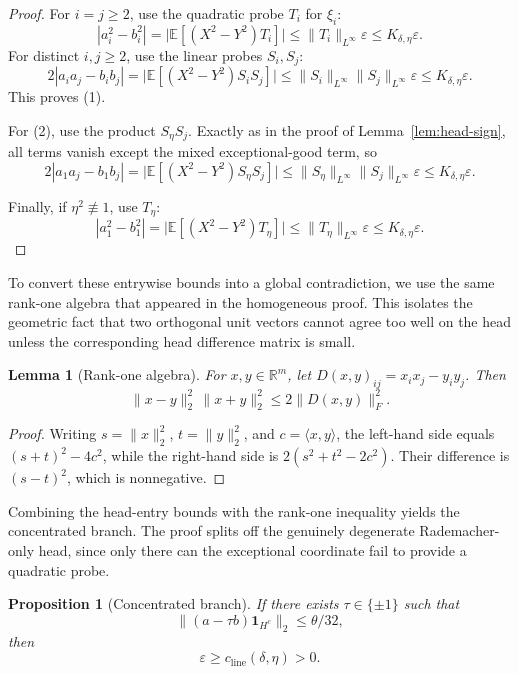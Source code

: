 \documentclass[11pt]{amsart}
\numberwithin{equation}{section}
\newtheorem{proposition}[theorem]{Proposition}
\newtheorem{lemma}[theorem]{Lemma}
\theoremstyle{definition}
\theoremstyle{remark}
\newcommand{\E}{\mathbb E}
\newcommand{\R}{\mathbb R}
\newcommand{\eps}{\varepsilon}
\newcommand{\norm}[1]{\lVert #1 \rVert}
\newcommand{\ip}[2]{\langle #1,#2\rangle}
\begin{document}
\begin{proof}
For $i=j\ge2$, use the quadratic probe $T_i$ for $\xi_i$:
\[
|a_i^2-b_i^2|
=\bigl|\E[(X^2-Y^2)T_i]\bigr|
\le \norm{T_i}_{L^\infty}\eps
\le K_{\delta,\eta}\eps.
\]
For distinct $i,j\ge2$, use the linear probes $S_i,S_j$:
\[
2|a_i a_j-b_i b_j|
=\bigl|\E[(X^2-Y^2)S_iS_j]\bigr|
\le \norm{S_i}_{L^\infty}\norm{S_j}_{L^\infty}\eps
\le K_{\delta,\eta}\eps.
\]
This proves \rm(1).

For \rm(2), use the product $S_\eta S_j$.  Exactly as in the proof of
Lemma~\ref{lem:head-sign}, all terms vanish except the mixed
exceptional-good term, so
\[
2|a_1a_j-b_1b_j|
=\bigl|\E[(X^2-Y^2)S_\eta S_j]\bigr|
\le \norm{S_\eta}_{L^\infty}\norm{S_j}_{L^\infty}\eps
\le K_{\delta,\eta}\eps.
\]

Finally, if $\eta^2\not\equiv1$, use $T_\eta$:
\[
|a_1^2-b_1^2|
=\bigl|\E[(X^2-Y^2)T_\eta]\bigr|
\le \norm{T_\eta}_{L^\infty}\eps
\le K_{\delta,\eta}\eps.
\]
\end{proof}

To convert these entrywise bounds into a global contradiction, we use the same
rank-one algebra that appeared in the homogeneous proof.  This isolates the
geometric fact that two orthogonal unit vectors cannot agree too well on the
head unless the corresponding head difference matrix is small.

\begin{lemma}[Rank-one algebra]\label{lem:rank-one}
For $x,y\in\R^m$, let $D(x,y)_{ij}=x_ix_j-y_iy_j$.  Then
\[
\norm{x-y}_2^2\,\norm{x+y}_2^2\le 2\norm{D(x,y)}_F^2.
\]
\end{lemma}

\begin{proof}
Writing $s=\norm{x}_2^2$, $t=\norm{y}_2^2$, and $c=\ip{x}{y}$, the left-hand
side equals $(s+t)^2-4c^2$, while the right-hand side is
$2(s^2+t^2-2c^2)$.  Their difference is $(s-t)^2$, which is nonnegative.
\end{proof}

Combining the head-entry bounds with the rank-one inequality yields the
concentrated branch.  The proof splits off the genuinely degenerate
Rademacher-only head, since only there can the exceptional coordinate fail to
provide a quadratic probe.

\begin{proposition}[Concentrated branch]\label{prop:concentrated}
If there exists $\tau\in\{\pm1\}$ such that
\[
\norm{(a-\tau b)\mathbf 1_{H^c}}_2\le \theta/32,
\]
then
\[
\eps\ge c_{\mathrm{line}}(\delta,\eta)>0.
\]
\end{proposition}
\end{document}
